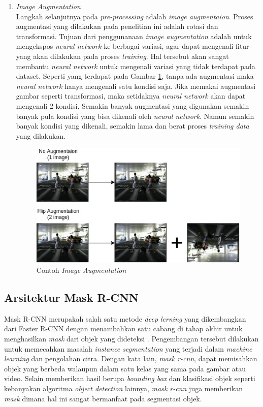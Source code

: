 \documentclass[conference]{IEEEtran}
\begin{document}
\begin{enumerate}
		\item \textit{Image Augmentation}\\
		Langkah selanjutnya pada \textit{pre-processing} adalah \textit{image augmentaion}. Proses augmentasi yang dilakukan pada penelitian ini adalah rotasi dan transformasi. Tujuan dari penggunanaan \textit{image augmentation} adalah untuk mengekspos \textit{neural network} ke berbagai variasi, agar dapat mengenali fitur yang akan dilakukan pada proses \textit{training}. Hal tersebut akan sangat membantu \textit{neural network} untuk mengenali variasi yang tidak terdapat pada dataset. Seperti yang terdapat pada Gambar \ref{fig:image-augmentation}, tanpa ada augmentasi maka \textit{neural network} hanya mengenali satu kondisi saja. Jika memakai augmentasi gambar seperti transformasi, maka setidaknya \textit{neural network} akan dapat mengenali 2 kondisi. Semakin banyak augmentasi yang digunakan semakin banyak pula kondisi yang bisa dikenali oleh \textit{neural network}. Namun semakin banyak kondisi yang dikenali, semakin lama dan berat proses \textit{training data} yang dilakukan. 
		
		\begin{figure}[h]
			\centering
			\includegraphics[scale=0.45]{img/image-augmentation.png}
			\caption{Contoh \textit{Image Augmentation}}
			\label{fig:image-augmentation}
		\end{figure}
		
	\end{enumerate}
	
	\subsection{Arsitektur Mask R-CNN}
	\vspace{1ex}
	Mask R-CNN merupakah salah satu metode \textit{deep lerning} yang dikembangkan dari Faster R-CNN dengan menambahkan satu cabang di tahap akhir untuk menghasilkan \textit{mask} dari objek yang dideteksi \cite{cit:11}. Pengembangan tersebut dilakukan untuk memecahkan masalah \textit{instance segmentation} yang terjadi dalam \textit{machine learning} dan pengolahan citra. Dengan kata lain, \textit{mask r-cnn}, dapat memisahkan objek yang berbeda walaupun dalam satu kelas yang sama pada gambar atau video. Selain memberikan hasil berupa \textit{bounding box} dan klasifikasi objek seperti kebanyakan algoritma \textit{object detection} lainnya, \textit{mask r-cnn} juga memberikan \textit{mask} dimana hal ini sangat bermanfaat pada segmentasi objek.
	
\end{document}
